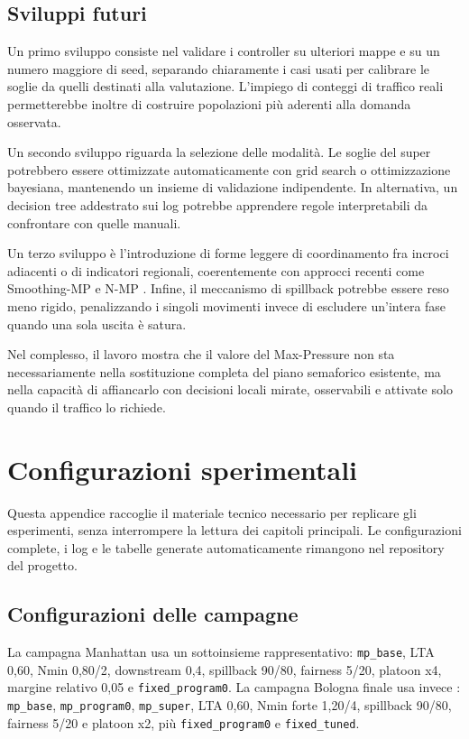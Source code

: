 \documentclass[12pt,a4paper,oneside]{report}
\numberwithin{equation}{chapter}
\begin{document}
\section{Sviluppi futuri}

Un primo sviluppo consiste nel validare i controller su ulteriori mappe e su
un numero maggiore di seed, separando chiaramente i casi usati per calibrare le
soglie da quelli destinati alla valutazione. L'impiego di conteggi di traffico
reali permetterebbe inoltre di costruire popolazioni più aderenti alla domanda
osservata.

Un secondo sviluppo riguarda la selezione delle modalità. Le soglie del super
potrebbero essere ottimizzate automaticamente con grid search o ottimizzazione
bayesiana, mantenendo un insieme di validazione indipendente. In alternativa,
un decision tree addestrato sui log potrebbe apprendere regole interpretabili
da confrontare con quelle manuali.

Un terzo sviluppo è l'introduzione di forme leggere di coordinamento fra
incroci adiacenti o di indicatori regionali, coerentemente con approcci recenti
come Smoothing-MP e N-MP \cite{xu2024smoothing,liu2024nmp}. Infine, il
meccanismo di spillback potrebbe essere reso meno rigido, penalizzando i singoli
movimenti invece di escludere un'intera fase quando una sola uscita è satura.

Nel complesso, il lavoro mostra che il valore del Max-Pressure non sta
necessariamente nella sostituzione completa del piano semaforico esistente, ma
nella capacità di affiancarlo con decisioni locali mirate, osservabili e
attivate solo quando il traffico lo richiede.

\appendix
\chapter{Configurazioni sperimentali}
\label{chap:appendici}

Questa appendice raccoglie il materiale tecnico necessario per replicare gli
esperimenti, senza interrompere la lettura dei capitoli principali. Le
configurazioni complete, i log e le tabelle generate automaticamente rimangono
nel repository del progetto.

\section{Configurazioni delle campagne}

La campagna Manhattan usa un sottoinsieme rappresentativo: \texttt{mp\_base}, LTA 0,60,
Nmin 0,80/2, downstream 0,4, spillback 90/80, fairness 5/20, platoon x4,
margine relativo 0,05 e \texttt{fixed\_program0}. La campagna Bologna finale
usa invece : \texttt{mp\_base}, \texttt{mp\_program0},
\texttt{mp\_super}, LTA 0,60, Nmin forte 1,20/4, spillback 90/80, fairness
5/20 e platoon x2, più \texttt{fixed\_program0} e
\texttt{fixed\_tuned}.
\end{document}
